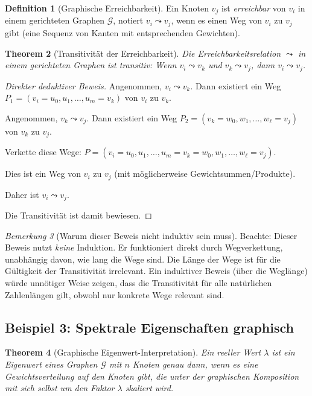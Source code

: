 \documentclass[12pt, a4paper]{article}
\newtheorem{theorem}{Theorem}[section]
\theoremstyle{definition}
\newtheorem{definition}[theorem]{Definition}
\theoremstyle{remark}
\newtheorem{remark}[theorem]{Bemerkung}
\newcommand{\Graph}{\mathcal{G}}
\begin{document}
\begin{definition}[Graphische Erreichbarkeit]
\label{def:erreichbarkeit}
Ein Knoten $v_j$ ist \emph{erreichbar} von $v_i$ in einem gerichteten Graphen $\Graph$, notiert $v_i \leadsto v_j$, wenn es einen Weg von $v_i$ zu $v_j$ gibt (eine Sequenz von Kanten mit entsprechenden Gewichten).
\end{definition}

\begin{theorem}[Transitivität der Erreichbarkeit]
\label{thm:erreichbarkeit_transitiv}
Die Erreichbarkeitsrelation $\leadsto$ in einem gerichteten Graphen ist transitiv: Wenn $v_i \leadsto v_k$ und $v_k \leadsto v_j$, dann $v_i \leadsto v_j$.
\end{theorem}

\begin{proof}[Direkter deduktiver Beweis]
Angenommen, $v_i \leadsto v_k$. Dann existiert ein Weg $P_1 = (v_i = u_0, u_1, \ldots, u_m = v_k)$ von $v_i$ zu $v_k$.

Angenommen, $v_k \leadsto v_j$. Dann existiert ein Weg $P_2 = (v_k = w_0, w_1, \ldots, w_\ell = v_j)$ von $v_k$ zu $v_j$.

Verkette diese Wege: $P = (v_i = u_0, u_1, \ldots, u_m = v_k = w_0, w_1, \ldots, w_\ell = v_j)$.

Dies ist ein Weg von $v_i$ zu $v_j$ (mit möglicherweise Gewichtsummen/Produkte).

Daher ist $v_i \leadsto v_j$.

Die Transitivität ist damit bewiesen.
\end{proof}

\begin{remark}[Warum dieser Beweis nicht induktiv sein muss]
\label{rem:nicht_induktiv}
Beachte: Dieser Beweis nutzt \emph{keine} Induktion. Er funktioniert direkt durch Wegverkettung, unabhängig davon, wie lang die Wege sind. Die Länge der Wege ist für die Gültigkeit der Transitivität irrelevant. Ein induktiver Beweis (über die Weglänge) würde unnötiger Weise zeigen, dass die Transitivität für alle natürlichen Zahlenlängen gilt, obwohl nur konkrete Wege relevant sind.
\end{remark}

\subsection{Beispiel 3: Spektrale Eigenschaften graphisch}
\label{subsec:beispiel_spektral}

\begin{theorem}[Graphische Eigenwert-Interpretation]
\label{thm:graph_eigenwert}
Ein reeller Wert $\lambda$ ist ein Eigenwert eines Graphen $\Graph$ mit $n$ Knoten genau dann, wenn es eine Gewichtsverteilung auf den Knoten gibt, die unter der graphischen Komposition mit sich selbst um den Faktor $\lambda$ skaliert wird.
\end{theorem}
\end{document}
